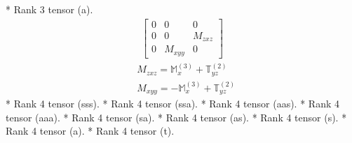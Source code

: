 \documentclass[fleqn,8pt,landscape]{jsarticle}
\begin{document}
* Rank 3 tensor (a).
\begin{align*}
\begin{bmatrix} 0 & 0 & 0 \\ 0 & 0 & M_{zxz} \\ 0 & M_{xyy} & 0 \end{bmatrix}
\end{align*}
\begin{align*}
& M_{zxz} = \mathbb{M}_{x}^{(3)} + \mathbb{T}_{yz}^{(2)} \\
& M_{xyy} = - \mathbb{M}_{x}^{(3)} + \mathbb{T}_{yz}^{(2)}
\end{align*}
* Rank 4 tensor (sss).
* Rank 4 tensor (ssa).
* Rank 4 tensor (aas).
* Rank 4 tensor (aaa).
* Rank 4 tensor (sa).
* Rank 4 tensor (as).
* Rank 4 tensor (s).
* Rank 4 tensor (a).
* Rank 4 tensor (t).
\end{document}
